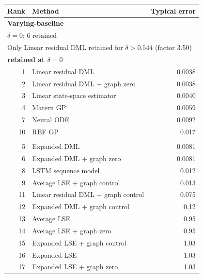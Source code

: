 \begin{tabular}{rlr}
\toprule
Rank & Method & Typical error \\
\midrule
\multicolumn{3}{l}{\textbf{Varying-baseline}} \\
\multicolumn{3}{l}{\(\delta=0\): 6 retained} \\
\multicolumn{3}{l}{Only Linear residual DML retained for \(\delta>0.544\) (factor 3.50)} \\
\multicolumn{3}{l}{\textbf{retained at \(\delta=0\)}} \\
1 & Linear residual DML & 0.0038 \\
2 & Linear residual DML + graph zero & 0.0038 \\
3 & Linear state-space estimator & 0.0040 \\
4 & Matern GP & 0.0059 \\
7 & Neural ODE & 0.0092 \\
10 & RBF GP & 0.017 \\
\addlinespace[2pt]
\multicolumn{3}{l}{\textbf{not retained at \(\delta=0\)}} \\
5 & Expanded DML & 0.0081 \\
6 & Expanded DML + graph zero & 0.0081 \\
8 & LSTM sequence model & 0.012 \\
9 & Average LSE + graph control & 0.013 \\
11 & Linear residual DML + graph control & 0.075 \\
12 & Expanded DML + graph control & 0.12 \\
13 & Average LSE & 0.95 \\
14 & Average LSE + graph zero & 0.95 \\
15 & Expanded LSE + graph control & 1.03 \\
16 & Expanded LSE & 1.03 \\
17 & Expanded LSE + graph zero & 1.03 \\
\bottomrule
\end{tabular}
